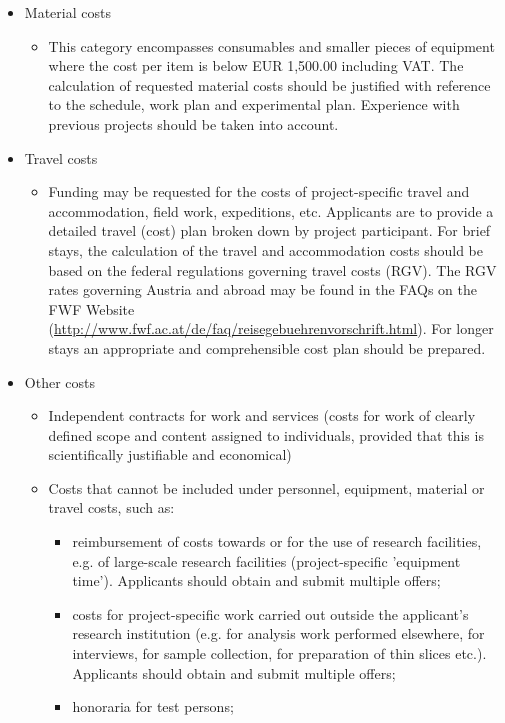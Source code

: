 \documentclass[a4paper,11pt]{article}
\begin{document}
{\begin{itemize}
\item Material costs
	\begin{itemize}
	\item     This category encompasses consumables and smaller pieces of equipment where the cost per item is below EUR 1,500.00 including VAT. The calculation of requested material costs should be justified with reference to the schedule, work plan and experimental plan. Experience with previous projects should be taken into account.
	\end{itemize}
\item Travel costs
	\begin{itemize}
	\item     Funding may be requested for the costs of project-specific travel and accommodation, field work, expeditions, etc. Applicants are to provide a detailed travel (cost) plan broken down by project participant. For brief stays, the calculation of the travel and accommodation costs should be based on the federal regulations governing travel costs (RGV). The RGV rates governing Austria and abroad may be found in the FAQs on the FWF Website (\href{http://www.fwf.ac.at/de/faq/reisegebuehrenvorschrift.html}{http://www.fwf.ac.at/de/faq/reisegebuehrenvorschrift.html}). For longer stays an appropriate and comprehensible cost plan should be prepared.
	\end{itemize}
\item Other costs
	\begin{itemize}
	\item     Independent contracts for work and services (costs for work of clearly defined scope and content assigned to individuals, provided that this is scientifically justifiable and economical)
    	\item     Costs that cannot be included under personnel, equipment, material or travel costs, such as:
		\begin{itemize}
		\item         reimbursement of costs towards or for the use of research facilities, e.g. of large-scale research facilities (project-specific 'equipment time'). Applicants should obtain and submit multiple offers;
		\item         costs for project-specific work carried out outside the applicant's research institution (e.g. for analysis work performed elsewhere, for interviews, for sample collection, for preparation of thin slices etc.). Applicants should obtain and submit multiple offers;
		\item         honoraria for test persons;
		\end{itemize}
	\end{itemize}
\end{itemize}
}
\end{document}
